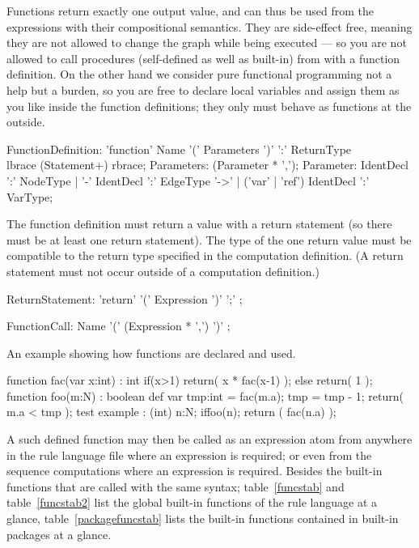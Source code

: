 Functions return exactly one output value, and can thus be used from the expressions with their compositional semantics.
They are side-effect free, meaning they are not allowed to change the graph while being executed ---
so you are not allowed to call procedures (self-defined as well as built-in) from with a function definition.
On the other hand we consider pure functional programming not a help but a burden, so you are free to declare local variables and assign them as you like inside the function definitions; they only must behave as functions at the outside.

\begin{rail} 
  FunctionDefinition: 
	'function' Name '(' Parameters ')' ':' ReturnType \\
	lbrace (Statement+) rbrace;
  Parameters: (Parameter * ',');
  Parameter: IdentDecl ':' NodeType |
  '-' IdentDecl ':' EdgeType '->' |
  ('var' | 'ref') IdentDecl ':' VarType;
\end{rail}

The function definition must return a value with a return statement (so there must be at least one return statement).
The type of the one return value must be compatible to the return type specified in the computation definition.
(A return statement must not occur outside of a computation definition.)

\begin{rail}
  ReturnStatement: 'return' '(' Expression ')' ';' ;
\end{rail}

\begin{rail}
  FunctionCall: Name '(' (Expression * ',') ')' ;
\end{rail}

\begin{example}
An example showing how functions are declared and used.
  \begin{grgen}
function fac(var x:int) : int
{
	if(x>1) {
		return( x * fac(x-1) );
	} else {
		return( 1 );
	}
}
function foo(m:N) : boolean
{
	def var tmp:int = fac(m.a);
	tmp = tmp - 1;
	return( m.a < tmp );
}
test example : (int)
{
	n:N;
	if{foo(n);}
	return ( fac(n.a) );
}
  \end{grgen}
\end{example}

A such defined function may then be called as an expression atom from anywhere in the rule language file where an expression is required; or even from the sequence computations where an expression is required.
Besides the built-in functions that are called with the same syntax;
table~\ref{funcstab} and table~\ref{funcstab2} list the global built-in functions of the rule language at a glance,
table~\ref{packagefuncstab} lists the built-in functions contained in built-in packages at a glance.

